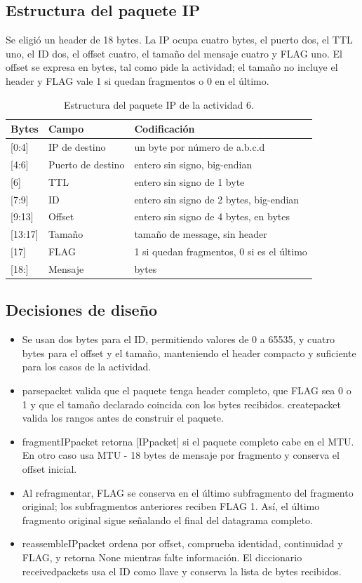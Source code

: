 \documentclass[
	spanish, %
	letterpaper, oneside
]{article}
\newcommand{\codeunderscore}{\textunderscore\allowbreak}
\newcommand{\code}[1]{{\let\_\codeunderscore#1}}     %
\begin{document}
\subsection{Estructura del paquete IP}
Se eligió un header de 18 bytes. La IP ocupa cuatro bytes, el puerto dos, el TTL uno, el ID dos, el offset cuatro, el tamaño del mensaje cuatro y FLAG uno. El offset se expresa en bytes, tal como pide la actividad; el tamaño no incluye el header y FLAG vale 1 si quedan fragmentos o 0 en el último.

\begin{table}[ht]
\centering
\caption{Estructura del paquete IP de la actividad 6.}
\label{tab:header-fragmentacion}
\begin{tabular}{lll}
\hline
Bytes & Campo & Codificación \\
\hline
{[0:4]} & IP de destino & un byte por número de a.b.c.d \\
{[4:6]} & Puerto de destino & entero sin signo, big-endian \\
{[6]} & TTL & entero sin signo de 1 byte \\
{[7:9]} & ID & entero sin signo de 2 bytes, big-endian \\
{[9:13]} & Offset & entero sin signo de 4 bytes, en bytes \\
{[13:17]} & Tamaño & tamaño de message, sin header \\
{[17]} & FLAG & 1 si quedan fragmentos, 0 si es el último \\
{[18:]} & Mensaje & bytes \\
\hline
\end{tabular}
\end{table}

\subsection{Decisiones de diseño}
\begin{itemize}
\item Se usan dos bytes para el ID, permitiendo valores de 0 a 65535, y cuatro bytes para el offset y el tamaño, manteniendo el header compacto y suficiente para los casos de la actividad.
\item \code{parse\_packet} valida que el paquete tenga header completo, que FLAG sea 0 o 1 y que el tamaño declarado coincida con los bytes recibidos. \code{create\_packet} valida los rangos antes de construir el paquete.
\item \code{fragment\_IP\_packet} retorna \code{[IP\_packet]} si el paquete completo cabe en el MTU. En otro caso usa \code{MTU - 18} bytes de mensaje por fragmento y conserva el offset inicial.
\item Al refragmentar, FLAG se conserva en el último subfragmento del fragmento original; los subfragmentos anteriores reciben FLAG 1. Así, el último fragmento original sigue señalando el final del datagrama completo.
\item \code{reassemble\_IP\_packet} ordena por offset, comprueba identidad, continuidad y FLAG, y retorna None mientras falte información. El diccionario \code{received\_packets} usa el ID como llave y conserva la lista de bytes recibidos.
\end{itemize}
\end{document}

